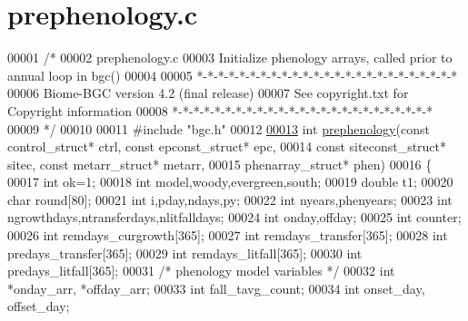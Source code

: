 \hypertarget{prephenology_8c_source}{}\section{prephenology.\+c}
\label{prephenology_8c_source}

\begin{DoxyCode}
00001 \textcolor{comment}{/*}
00002 \textcolor{comment}{prephenology.c}
00003 \textcolor{comment}{Initialize phenology arrays, called prior to annual loop in bgc()}
00004 \textcolor{comment}{}
00005 \textcolor{comment}{*-*-*-*-*-*-*-*-*-*-*-*-*-*-*-*-*-*-*-*-*-*-*-*-*}
00006 \textcolor{comment}{Biome-BGC version 4.2 (final release)}
00007 \textcolor{comment}{See copyright.txt for Copyright information}
00008 \textcolor{comment}{*-*-*-*-*-*-*-*-*-*-*-*-*-*-*-*-*-*-*-*-*-*-*-*-*}
00009 \textcolor{comment}{*/}
00010 
00011 \textcolor{preprocessor}{#include "bgc.h"}
00012 
\hypertarget{prephenology_8c_source_l00013}{}\hyperlink{prephenology_8c_a268168ddb0923733bcc36138cda1b94b}{00013} \textcolor{keywordtype}{int} \hyperlink{prephenology_8c_a268168ddb0923733bcc36138cda1b94b}{prephenology}(\textcolor{keyword}{const} control\_struct* ctrl, \textcolor{keyword}{const} epconst\_struct* epc, 
00014 \textcolor{keyword}{const} siteconst\_struct* sitec, \textcolor{keyword}{const} metarr\_struct* metarr,
00015 phenarray\_struct* phen)
00016 \{
00017     \textcolor{keywordtype}{int} ok=1;
00018     \textcolor{keywordtype}{int} model,woody,evergreen,south;
00019     \textcolor{keywordtype}{double} t1;
00020     \textcolor{keywordtype}{char} round[80];
00021     \textcolor{keywordtype}{int} i,pday,ndays,py;
00022     \textcolor{keywordtype}{int} nyears,phenyears;
00023     \textcolor{keywordtype}{int} ngrowthdays,ntransferdays,nlitfalldays;
00024     \textcolor{keywordtype}{int} onday,offday;
00025     \textcolor{keywordtype}{int} counter;
00026     \textcolor{keywordtype}{int} remdays\_curgrowth[365];
00027     \textcolor{keywordtype}{int} remdays\_transfer[365];
00028     \textcolor{keywordtype}{int} predays\_transfer[365];
00029     \textcolor{keywordtype}{int} remdays\_litfall[365];
00030     \textcolor{keywordtype}{int} predays\_litfall[365];
00031     \textcolor{comment}{/* phenology model variables */}
00032     \textcolor{keywordtype}{int} *onday\_arr, *offday\_arr;
00033     \textcolor{keywordtype}{int} fall\_tavg\_count;
00034     \textcolor{keywordtype}{int} onset\_day, offset\_day;

\end{DoxyCode}
